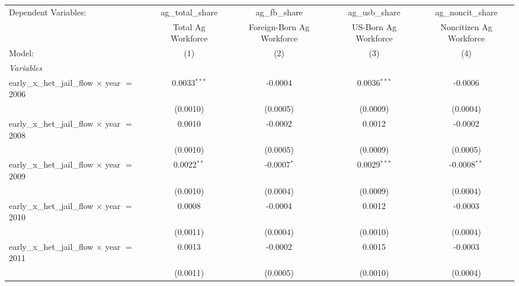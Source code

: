 
\begingroup
\centering
\begin{tabular}{lcccc}
   \tabularnewline \midrule \midrule
   Dependent Variables:                                  & ag\_total\_share       & ag\_fb\_share             & ag\_usb\_share         & ag\_noncit\_share\\    
                                                         & Total Ag Workforce     & Foreign-Born Ag Workforce & US-Born Ag Workforce   & Noncitizen Ag Workforce \\   
   Model:                                                & (1)                    & (2)                       & (3)                    & (4)\\  
   \midrule
   \emph{Variables}\\
   early\_x\_het\_jail\_flow $\times$ year $=$ 2006      & 0.0033$^{***}$         & -0.0004                   & 0.0036$^{***}$         & -0.0006\\   
                                                         & (0.0010)               & (0.0005)                  & (0.0009)               & (0.0004)\\   
   early\_x\_het\_jail\_flow $\times$ year $=$ 2008      & 0.0010                 & -0.0002                   & 0.0012                 & -0.0002\\   
                                                         & (0.0010)               & (0.0005)                  & (0.0009)               & (0.0005)\\   
   early\_x\_het\_jail\_flow $\times$ year $=$ 2009      & 0.0022$^{**}$          & -0.0007$^{*}$             & 0.0029$^{***}$         & -0.0008$^{**}$\\   
                                                         & (0.0010)               & (0.0004)                  & (0.0009)               & (0.0004)\\   
   early\_x\_het\_jail\_flow $\times$ year $=$ 2010      & 0.0008                 & -0.0004                   & 0.0012                 & -0.0003\\   
                                                         & (0.0011)               & (0.0004)                  & (0.0010)               & (0.0004)\\   
   early\_x\_het\_jail\_flow $\times$ year $=$ 2011      & 0.0013                 & -0.0002                   & 0.0015                 & -0.0003\\   
                                                         & (0.0011)               & (0.0005)                  & (0.0010)               & (0.0004)\\   

\end{tabular}
